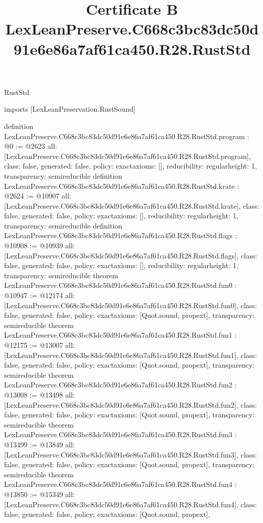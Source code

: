 \begin{lexlean}{RustStd}
\title{Certificate B LexLeanPreserve.C668c3bc83dc50d91e6e86a7af61ca450.R28.RustStd}
\begin{coremodule}
imports [LexLeanPreservation.RustSound]

definition LexLeanPreserve.C668c3bc83dc50d91e6e86a7af61ca450.R28.RustStd.program : @0 := @2623 {
  all: [LexLeanPreserve.C668c3bc83dc50d91e6e86a7af61ca450.R28.RustStd.program],
  class: false,
  generated: false,
  policy: exact{axioms: []},
  reducibility: regular{height: 1},
  transparency: semireducible
}
definition LexLeanPreserve.C668c3bc83dc50d91e6e86a7af61ca450.R28.RustStd.krate : @2624 := @10907 {
  all: [LexLeanPreserve.C668c3bc83dc50d91e6e86a7af61ca450.R28.RustStd.krate],
  class: false,
  generated: false,
  policy: exact{axioms: []},
  reducibility: regular{height: 1},
  transparency: semireducible
}
definition LexLeanPreserve.C668c3bc83dc50d91e6e86a7af61ca450.R28.RustStd.flags : @10908 := @10939 {
  all: [LexLeanPreserve.C668c3bc83dc50d91e6e86a7af61ca450.R28.RustStd.flags],
  class: false,
  generated: false,
  policy: exact{axioms: []},
  reducibility: regular{height: 1},
  transparency: semireducible
}
theorem LexLeanPreserve.C668c3bc83dc50d91e6e86a7af61ca450.R28.RustStd.fun0 : @10947 := @12174 {
  all: [LexLeanPreserve.C668c3bc83dc50d91e6e86a7af61ca450.R28.RustStd.fun0],
  class: false,
  generated: false,
  policy: exact{axioms: [Quot.sound, propext]},
  transparency: semireducible
}
theorem LexLeanPreserve.C668c3bc83dc50d91e6e86a7af61ca450.R28.RustStd.fun1 : @12175 := @13007 {
  all: [LexLeanPreserve.C668c3bc83dc50d91e6e86a7af61ca450.R28.RustStd.fun1],
  class: false,
  generated: false,
  policy: exact{axioms: [Quot.sound, propext]},
  transparency: semireducible
}
theorem LexLeanPreserve.C668c3bc83dc50d91e6e86a7af61ca450.R28.RustStd.fun2 : @13008 := @13498 {
  all: [LexLeanPreserve.C668c3bc83dc50d91e6e86a7af61ca450.R28.RustStd.fun2],
  class: false,
  generated: false,
  policy: exact{axioms: [Quot.sound, propext]},
  transparency: semireducible
}
theorem LexLeanPreserve.C668c3bc83dc50d91e6e86a7af61ca450.R28.RustStd.fun3 : @13499 := @13849 {
  all: [LexLeanPreserve.C668c3bc83dc50d91e6e86a7af61ca450.R28.RustStd.fun3],
  class: false,
  generated: false,
  policy: exact{axioms: [Quot.sound, propext]},
  transparency: semireducible
}
theorem LexLeanPreserve.C668c3bc83dc50d91e6e86a7af61ca450.R28.RustStd.fun4 : @13850 := @15349 {
  all: [LexLeanPreserve.C668c3bc83dc50d91e6e86a7af61ca450.R28.RustStd.fun4],
  class: false,
  generated: false,
  policy: exact{axioms: [Quot.sound, propext]},
}
\end{coremodule}
\end{lexlean}
